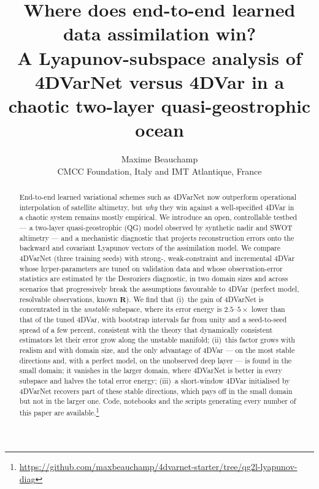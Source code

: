 \documentclass[10pt,a4paper]{article}
\title{\bfseries Where does end-to-end learned data assimilation win?\\
\large A Lyapunov-subspace analysis of 4DVarNet versus 4DVar in a chaotic two-layer quasi-geostrophic ocean}
\author{Maxime Beauchamp\\
\small CMCC Foundation, Italy \quad and \quad IMT Atlantique, France}
\date{}
\newcommand{\R}{\mathbf{R}}
\newcommand{\code}{\url{https://github.com/maxbeauchamp/4dvarnet-starter/tree/qg2l-lyapunov-diag}}
\begin{document}
\maketitle

\begin{abstract}
End-to-end learned variational schemes such as 4DVarNet now outperform operational interpolation of satellite
altimetry, but \emph{why} they win against a well-specified 4DVar in a chaotic system remains mostly empirical.
We introduce an open, controllable testbed --- a two-layer quasi-geostrophic (QG) model observed by synthetic nadir
and SWOT altimetry --- and a mechanistic diagnostic that projects reconstruction errors onto the backward and covariant
Lyapunov vectors of the assimilation model. We compare 4DVarNet (three training seeds) with strong-, weak-constraint
and incremental 4DVar whose hyper-parameters are tuned on validation data and whose observation-error statistics are
estimated by the Desroziers diagnostic, in two domain sizes and across scenarios that progressively break the
assumptions favourable to 4DVar (perfect model, resolvable observations, known $\R$). We find that
(i)~the gain of 4DVarNet is concentrated in the \emph{unstable} subspace, where its error energy is
$2.5$--$5\times$ lower than that of the tuned 4DVar, with bootstrap intervals far from unity and a seed-to-seed
spread of a few percent, consistent with the theory that dynamically consistent estimators let their error grow along
the unstable manifold;
(ii)~this factor grows with realism and with domain size, and the only advantage of 4DVar --- on the most stable
directions and, with a perfect model, on the unobserved deep layer --- is found in the small domain; it vanishes in
the larger domain, where 4DVarNet is better in every subspace and halves the total error energy;
(iii)~a short-window 4DVar initialised by 4DVarNet recovers part of these stable directions, which pays off in the
small domain but not in the larger one. Code, notebooks and the scripts generating every number of this paper are
available.\footnote{\code}
\end{abstract}

\end{document}
